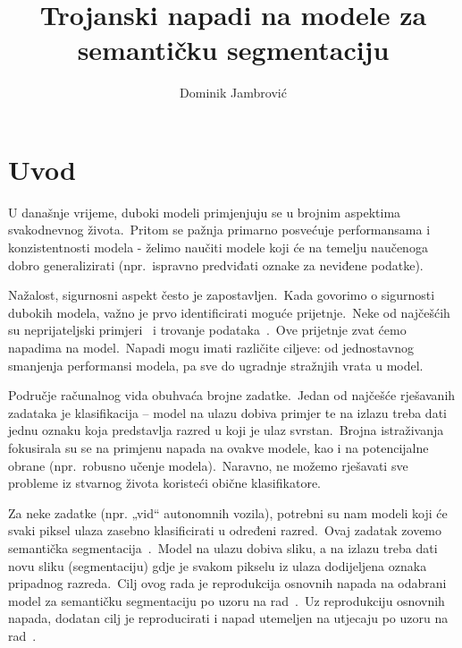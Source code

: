 \documentclass[times, utf8, seminar, numeric]{fer}
\begin{document}
\title{Trojanski napadi na modele za semantičku segmentaciju}

\author{Dominik Jambrović}


\maketitle

\tableofcontents

\chapter{Uvod}

U današnje vrijeme, duboki modeli primjenjuju se u brojnim aspektima svakodnevnog života.\ 
Pritom se pažnja primarno posvećuje performansama i konzistentnosti modela - želimo naučiti modele koji će na temelju naučenoga dobro generalizirati (npr.\ ispravno predviđati oznake za neviđene podatke).\
  
Nažalost, sigurnosni aspekt često je zapostavljen.\ Kada govorimo o sigurnosti dubokih modela, važno je prvo identificirati moguće prijetnje.\ 
Neke od najčešćih su neprijateljski primjeri~\cite{goodfellow2014explaining} i trovanje podataka~\cite{chen2017targeted}.\
Ove prijetnje zvat ćemo napadima na model.\ Napadi mogu imati različite ciljeve: od jednostavnog smanjenja performansi modela, pa sve do ugradnje stražnjih vrata u model.\
  
Područje računalnog vida obuhvaća brojne zadatke.\ Jedan od najčešće rješavanih zadataka je klasifikacija – model na ulazu dobiva primjer te na izlazu treba dati jednu oznaku koja predstavlja razred u koji je ulaz svrstan.\ 
Brojna istraživanja fokusirala su se na primjenu napada na ovakve modele, kao i na potencijalne obrane (npr.\ robusno učenje modela).\ Naravno, ne možemo rješavati sve probleme iz stvarnog života koristeći obične klasifikatore.\ 
  
Za neke zadatke (npr. „vid“ autonomnih vozila), potrebni su nam modeli koji će svaki piksel ulaza zasebno klasificirati u određeni razred.\ Ovaj zadatak zovemo semantička segmentacija~\cite{garcia2017review}.\
Model na ulazu dobiva sliku, a na izlazu treba dati novu sliku (segmentaciju) gdje je svakom pikselu iz ulaza dodijeljena oznaka pripadnog razreda.\ 
Cilj ovog rada je reprodukcija osnovnih napada na odabrani model za semantičku segmentaciju po uzoru na rad~\cite{li2021hidden}.\
Uz reprodukciju osnovnih napada, dodatan cilj je reproducirati i napad utemeljen na utjecaju po uzoru na rad~\cite{lan2023influencer}.\
\end{document}
